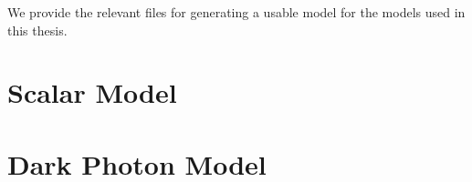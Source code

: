 \label{chapter:modelappendix}
We provide the relevant files for generating a usable \feynrules model for the models used in this thesis.

\section{Scalar Model}


\section{Dark Photon Model}
